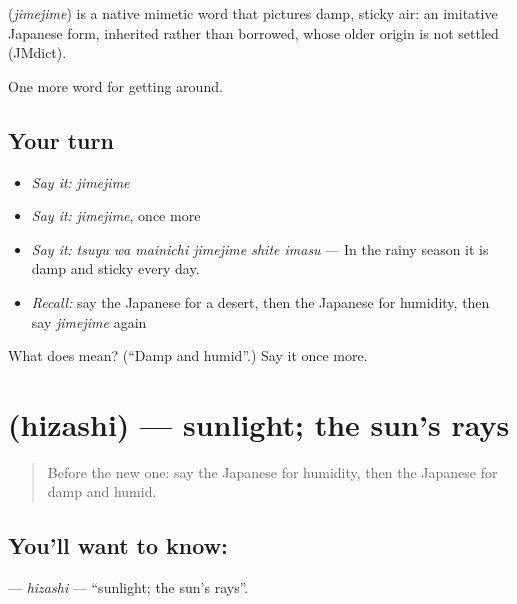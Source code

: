 \begin{cousinweb}
\textbf{} (\emph{jimejime}) is a native mimetic word that pictures damp, sticky air: an imitative Japanese form, inherited rather than borrowed, whose older origin is not settled (JMdict).
\end{cousinweb}

\begin{grammarlens}[title={What you've built}]
One more word for getting around.
\end{grammarlens}

\subsection*{Your turn}
\begin{itemize}
\raggedright
  \item \emph{Say it:} \emph{jimejime}
  \item \emph{Say it:} \emph{jimejime}, once more
  \item \emph{Say it:} \emph{tsuyu wa mainichi jimejime shite imasu} — In the rainy season it is damp and sticky every day.
  \item \emph{Recall:} say the Japanese for a desert, then the Japanese for humidity, then say \emph{jimejime} again
\end{itemize}

\begin{tcolorbox}[breakable,colback=teal!4,colframe=teal!35!black,title={Before you move on}]
What does  mean? (\textquotedblleft{}Damp and humid\textquotedblright{}.) Say it once more.
\end{tcolorbox}
\section[\texorpdfstring{\ja{ひざし} (hizashi)}{ひざし (hizashi)}]{ (hizashi) — sunlight; the sun's rays}

\label{lesson:JA-C414-hizashi}



\begin{quote}
Before the new one: say the Japanese for humidity, then the Japanese for damp and humid.
\end{quote}

\subsection*{You'll want to know: }
\textbf{} — \emph{hizashi} — \textquotedblleft{}sunlight; the sun's rays\textquotedblright{}.

